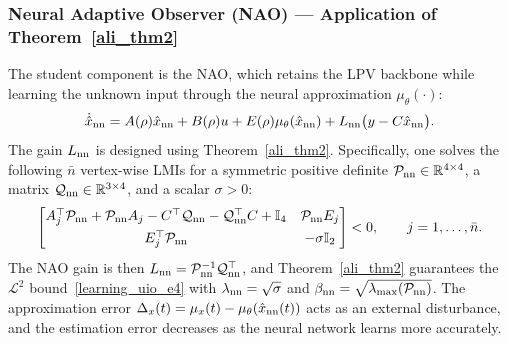 \subsubsection{Neural Adaptive Observer (NAO) --- Application of Theorem~\ref{ali_thm2}}\label{sec6_nao_vehicle}
The student component is the NAO, which retains the LPV backbone while learning the unknown input through the neural approximation $\mu_\theta(\cdot)$:
\begin{equation}\label{eq:vehicle_NAO}
    \dot{\hat{x}}_{\text{nn}} = A(\rho)\hat{x}_{\text{nn}} + B(\rho)u + E(\rho)\mu_\theta(\hat{x}_{\text{nn}}) + L_{\text{nn}}\big(y-C\hat{x}_{\text{nn}}\big).
\end{equation}
The gain $L_{\text{nn}}$ is designed using Theorem~\ref{ali_thm2}. Specifically, one solves the following $\bar{n}$ vertex-wise LMIs for a symmetric positive definite $\mathcal{P}_{\text{nn}}\in\mathbb{R}^{4\times 4}$, a matrix $\mathcal{Q}_{\text{nn}}\in\mathbb{R}^{3\times 4}$, and a scalar $\sigma>0$:
\begin{equation}\label{eq:vehicle_LMI_NAO}
\begin{bmatrix}
A_j^{\top} \mathcal{P}_{\text{nn}} + \mathcal{P}_{\text{nn}} A_j  - C^{\top} \mathcal{Q}_{\text{nn}}  - \mathcal{Q}_{\text{nn}}^{\top}  C + \mathbb{I}_4
&
\mathcal{P}_{\text{nn}} E_j
\\[4pt]
E_j^{\top} \mathcal{P}_{\text{nn}} &
- \sigma \mathbb{I}_{2}
\end{bmatrix} 
< 0, \qquad j=1,\dots,\bar{n}.
\end{equation}
The NAO gain is then $L_{\text{nn}} = \mathcal{P}_{\text{nn}}^{-1} \mathcal{Q}_{\text{nn}}^{\top}$, and Theorem~\ref{ali_thm2} guarantees the $\mathcal{L}^2$ bound~\eqref{learning_uio_e4} with $\lambda_{\text{nn}}=\sqrt{\sigma}$ and $\beta_{\text{nn}}=\sqrt{\lambda_{\max}(\mathcal{P}_{\text{nn}})}$. The approximation error $\Delta_x(t) = \mu_x(t) - \mu_\theta(\hat{x}_{\text{nn}}(t))$ acts as an external disturbance, and the estimation error decreases as the neural network learns more accurately.

